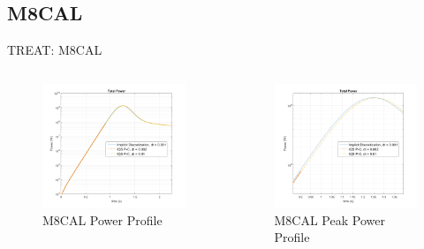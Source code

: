 \documentclass[8pt,xcolor=dvipnames]{beamer}
\begin{document}
\subsection{M8CAL}

\begin{frame}{TREAT: M8CAL}

\begin{columns}

\begin{figure}
\caption{M8CAL Power Profile}
\includegraphics[width=\linewidth]{figures/M8_1.png}
\end{figure}

\begin{figure}
\caption{M8CAL Peak Power Profile}
\includegraphics[width=\linewidth]{figures/M8_2.png}
\end{figure}

\end{columns}

\end{frame}
\end{document}
